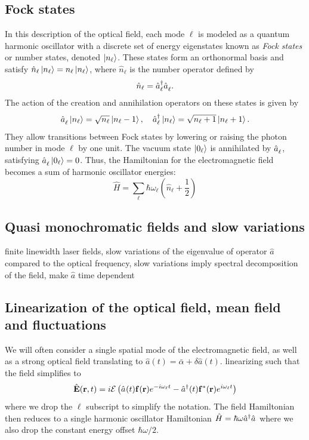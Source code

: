 \subsection*{Fock states}
In this description of the optical field, each mode $\ell$ is modeled as a quantum harmonic oscillator with a discrete set of energy eigenstates known as \textit{Fock states} or number states, denoted $\ket{n_\ell}$. These states form an orthonormal basis and satisfy $\hat{n}_{\ell} \ket{n_\ell} = n_\ell \ket{n_\ell}$, where $\hat{n}_{\ell}$ is the number operator defined by
\[
\hat{n}_{\ell} = \hat{a}_{\ell}^\dagger \hat{a}^{\vphantom{\dagger}}_{\ell}.
\]
The action of the creation and annihilation operators on these states is given by
\[
\hat{a}^{\vphantom{\dagger}}_{\ell} \ket{n_\ell} = \sqrt{n_\ell} \ket{n_\ell - 1}, \quad
\hat{a}_{\ell}^\dagger \ket{n_\ell} = \sqrt{n_\ell + 1} \ket{n_\ell + 1}.
\]
They allow transitions between Fock states by lowering or raising the photon number in mode $\ell$ by one unit. The vacuum state $\ket{0_\ell}$ is annihilated by $\hat{a}^{\vphantom{\dagger}}_{\ell}$, satisfying $\hat{a}^{\vphantom{\dagger}}_{\ell} \ket{0_\ell} = 0$. Thus, the Hamiltonian for the electromagnetic field becomes a sum of harmonic oscillator energies:
\begin{equation}
\hat{H} = \sum_\ell \hbar \omega_{\ell} \left( \hat{n}_\ell + \frac{1}{2} \right)
\end{equation}
\color{red} \subsection*{Quasi monochromatic fields and slow variations} \color{black}
finite linewidth laser fields, slow variations of the eigenvalue of operator $\hat{a}$ compared to the optical frequency, slow variations imply spectral decomposition of the field, make $\hat{a}$ time dependent 
\color{red} \subsection*{Linearization of the optical field, mean field and fluctuations} \color{black} 
We will often consider a single spatial mode of the electromagnetic field, as well as a strong optical field translating to $\hat{a}(t)=\bar{\alpha} + \delta \hat{a}(t)$.  linearizing such that the field simplifies to  
\begin{equation}
\hat{\mathbf{E}}(\mathbf{r}, t) = i \mathcal{E} \left(\hat{a}^{\vphantom{dagger}}(t)\mathbf{f}(\mathbf{r})e^{-i\omega_{\ell}t} - \hat{a}^\dagger(t) \mathbf{f}^*(\mathbf{r})e^{i\omega_{\ell}t} \right)
\end{equation}
where we drop the $\ell$ subscript to simplify the notation. The field Hamiltonian then reduces to a single harmonic oscillator Hamiltonian $\hat{H} = \hbar \omega \hat{a}^{\dagger} \hat{a}^{\vphantom{dagger}}$ where we also drop the constant energy offset $\hbar \omega/2$.\\

